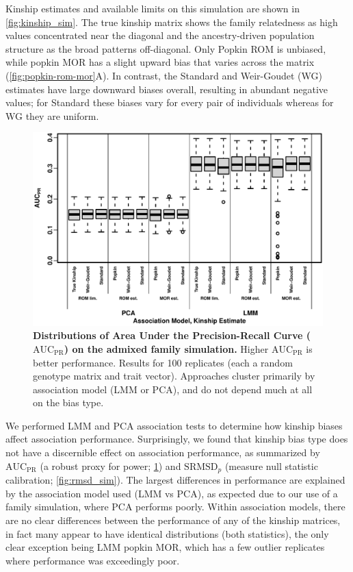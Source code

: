 \documentclass[11pt]{article}
\newcommand{\rmsd}{\text{SRMSD}_p}
\newcommand{\auc}{\text{AUC}_\text{PR}}
\begin{document}
Kinship estimates and available limits on this simulation are shown in \cref{fig:kinship_sim}.
The true kinship matrix shows the family relatedness as high values concentrated near the diagonal and the ancestry-driven population structure as the broad patterns off-diagonal.
Only Popkin ROM is unbiased, while popkin MOR has a slight upward bias that varies across the matrix (\cref{fig:popkin-rom-mor}A).
In contrast, the Standard and Weir-Goudet (WG) estimates have large downward biases overall, resulting in abundant negative values; for Standard these biases vary for every pair of individuals whereas for WG they are uniform.

\begin{figure}[bp!]
  \centering
  \includegraphics[width=\textwidth]{sim-admix-n1000-m100000-k3-f0.3-s0.5-mc100-h0.8-g20-fes/auc.pdf}
  \caption{
    {\bf Distributions of Area Under the Precision-Recall Curve ($\auc$) on the admixed family simulation.}
    Higher $\auc$ is better performance.
    Results for 100 replicates (each a random genotype matrix and trait vector).
    Approaches cluster primarily by association model (LMM or PCA), and do not depend much at all on the bias type.
  }
  \label{fig:auc_sim}
\end{figure}

We performed LMM and PCA association tests to determine how kinship biases affect association performance.
Surprisingly, we found that kinship bias type does not have a discernible effect on association performance, as summarized by $\auc$ (a robust proxy for power; \cref{fig:auc_sim}) and $\rmsd$ (measure null statistic calibration; \cref{fig:rmsd_sim}).
The largest differences in performance are explained by the association model used (LMM vs PCA), as expected due to our use of a family simulation, where PCA performs poorly.
Within association models, there are no clear differences between the performance of any of the kinship matrices, in fact many appear to have identical distributions (both statistics), the only clear exception being LMM popkin MOR, which has a few outlier replicates where performance was exceedingly poor.
\end{document}
